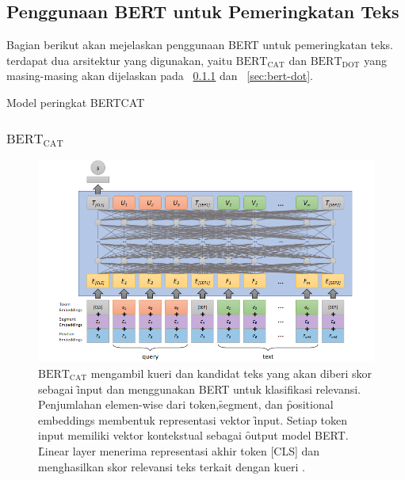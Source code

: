 	\subsection{Penggunaan BERT untuk Pemeringkatan Teks}
	Bagian berikut akan mejelaskan penggunaan BERT untuk pemeringkatan teks. terdapat dua arsitektur yang digunakan, yaitu $\text{BERT}_{\text{CAT}}$ dan $\text{BERT}_{\text{DOT}}$ yang masing-masing akan dijelaskan pada \sect~\ref{sec:bert-cat} dan \sect~\ref{sec:bert-dot}.

	Model peringkat BERTCAT 

	\subsubsection{$\text{BERT}_{\text{CAT}}$}
		\label{sec:bert-cat}

		\begin{figure}[!htbp]
			\centering
			\includegraphics[width=1\textwidth]{assets/pics/bertcat.png}
			\caption{$\text{BERT}_{\text{CAT}}$ mengambil kueri dan kandidat teks yang akan diberi skor sebagai \f{input} dan menggunakan BERT untuk klasifikasi relevansi. Penjumlahan elemen-wise dari token,\f{segment}, dan \f{positional embeddings} membentuk representasi vektor \f{input}. Setiap token input memiliki vektor kontekstual sebagai \f{output} model BERT. \f{Linear layer} menerima representasi akhir token [CLS] dan menghasilkan skor relevansi teks terkait dengan kueri \citep{textrankingsurvey}.}
			\label{fig:bert-cat}
		\end{figure}

